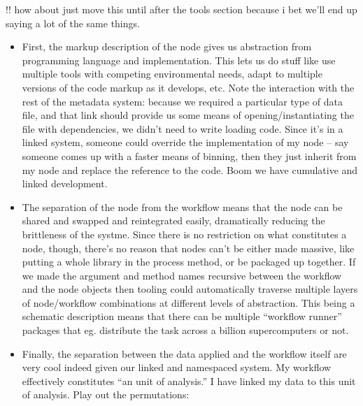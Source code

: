 \documentclass[10pt]{article}
\begin{document}
\begin{multicols}{2}
 !! how about just move this until after the tools section
because i bet we'll end up saying a lot of the same things.

\begin{itemize}
\item
  First, the markup description of the node gives us abstraction from
  programming language and implementation. This lets us do stuff like
  use multiple tools with competing environmental needs, adapt to
  multiple versions of the code markup as it develops, etc. Note the
  interaction with the rest of the metadata system: because we required
  a particular type of data file, and that link should provide us some
  means of opening/instantiating the file with dependencies, we didn't
  need to write loading code. Since it's in a linked system, someone
  could override the implementation of my node -- say someone comes up
  with a faster means of binning, then they just inherit from my node
  and replace the reference to the code. Boom we have cumulative and
  linked development.
\item
  The separation of the node from the workflow means that the node can
  be shared and swapped and reintegrated easily, dramatically reducing
  the brittleness of the systme. Since there is no restriction on what
  constitutes a node, though, there's no reason that nodes can't be
  either made massive, like putting a whole library in the process
  method, or be packaged up together. If we made the argument and method
  names recursive between the workflow and the node objects then tooling
  could automatically traverse multiple layers of node/workflow
  combinations at different levels of abstraction. This being a
  schematic description means that there can be multiple ``workflow
  runner'' packages that eg. distribute the task across a billion
  supercomputers or not.
\item
  Finally, the separation between the data applied and the workflow
  itself are very cool indeed given our linked and namespaced system. My
  workflow effectively constitutes ``an unit of analysis.'' I have
  linked my data to this unit of analysis. Play out the permutations:

  \begin{itemize}
  

\end{itemize}
\end{itemize}
\end{multicols}
\end{document}
